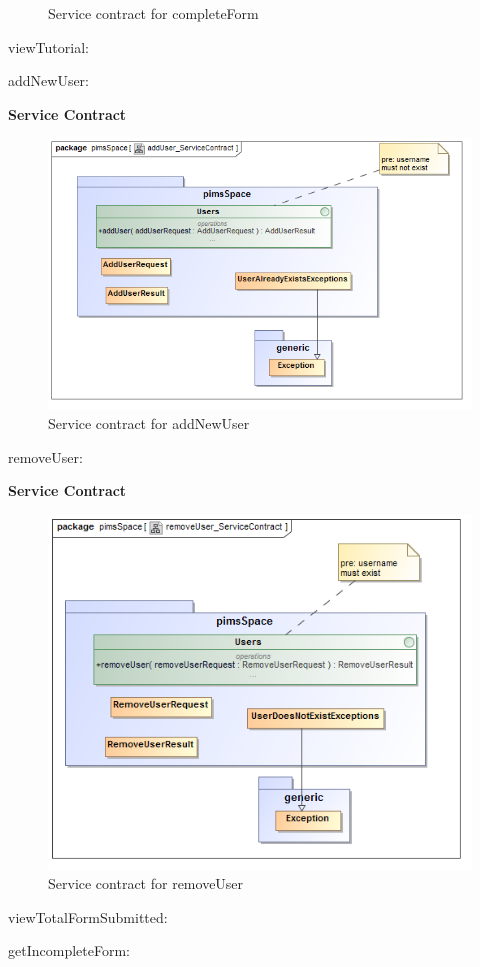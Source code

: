 \begin{description}
\begin{description}
\begin{figure}[H]
			\caption{Service contract for completeForm}
		\end{figure}
	\end{description} 
	\item{viewTutorial:}
	\item{addNewUser:}
			\begin{description}
		\item{\textbf{Service Contract}}
		\begin{figure}[H]
			\centerline{\includegraphics[width=0.7\linewidth]{./Functional_Requirements/Graphics/pimsSpace/addUser_ServiceContract}}
			\caption{Service contract for addNewUser}
		\end{figure}
	\end{description} 
	\item{removeUser:}
			\begin{description}
		\item{\textbf{Service Contract}}
		\begin{figure}[H]
			\centerline{\includegraphics[width=0.7\linewidth]{./Functional_Requirements/Graphics/pimsSpace/removeUser_ServiceContract}}
			\caption{Service contract for removeUser}
		\end{figure}
	\end{description} 
	\item{viewTotalFormSubmitted:} 
	\item{getIncompleteForm:}
\end{description}